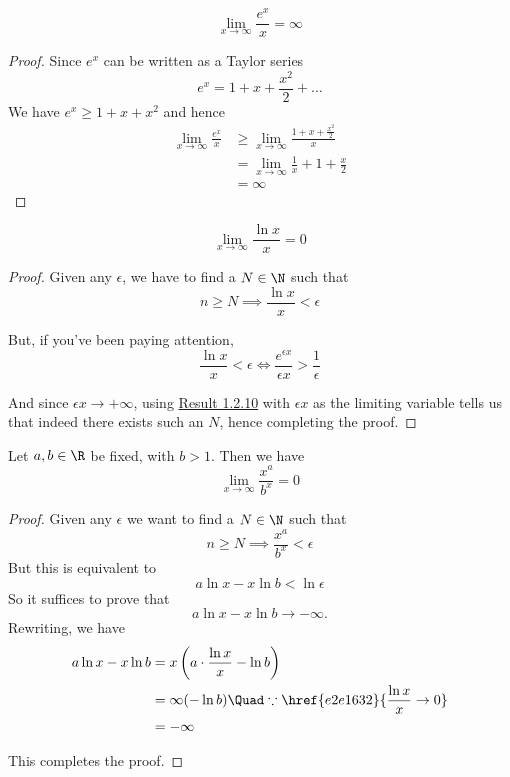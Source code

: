\label{b905ee7}
$$
  \lim_{x\to\infty}\frac{e^x}x=\infty
$$

\begin{proof}
  Since $e^x$ can be written as a Taylor series
  $$
    e^x=1 + x + \frac{x^2}2 +\ldots
  $$
  We have $e^x\geq 1 + x + x^2$ and hence
  \begin{align*}
    \lim_{x\to\infty}\frac{e^x}x
     & \geq\lim_{x\to\infty}\frac{1+x+\frac{x^2}2}x \\
     & =\lim_{x\to\infty}\frac1x + 1 + \frac{x}2    \\
     & = \infty
  \end{align*}
\end{proof}

\label{e2e1632}
$$
  \lim_{x\to\infty}\frac{\ln x}x = 0
$$

\begin{proof}
  Given any $\epsilon$, we have to find a $N\in\N$ such that
  $$
    n\geq N\implies\frac{\ln x}x<\epsilon
  $$

  But, if you've been paying attention,
  $$
    \frac{\ln x}x<\epsilon\iff\frac{e^{\epsilon x}}{\epsilon x}>\frac1\epsilon
  $$

  And since $\epsilon x\to+\infty$, using \href{b905ee7}{Result 1.2.10} with
  $\epsilon x$ as the limiting variable tells us that indeed there exists such an
  $N$, hence completing the proof.
\end{proof}

\label{f3540b0}

Let $a,b\in\R$ be fixed, with $b>1$. Then we have
$$
  \lim_{x\to\infty}\frac{x^a}{b^x}=0
$$

\begin{proof}
  Given any $\epsilon$ we want to find a $N\in\N$ such that
  $$
    n\geq N\implies\frac{x^a}{b^x}<\epsilon
  $$
  But this is equivalent to
  $$
    a\ln x-x\ln b<\ln\epsilon
  $$
  So it suffices to prove that
  $$
    a\ln x-x\ln b\to-\infty.
  $$
  Rewriting, we have
  \begin{align*}
    a\ln x-x\ln b
     & = x\left(a\cdot\frac{\ln x}{x}-\ln b\right)                       \\
     & = \infty(-\ln b) \Quad\because\href{e2e1632}{\frac{\ln x}{x}\to0} \\
     & = -\infty
  \end{align*}

  This completes the proof.
\end{proof}

